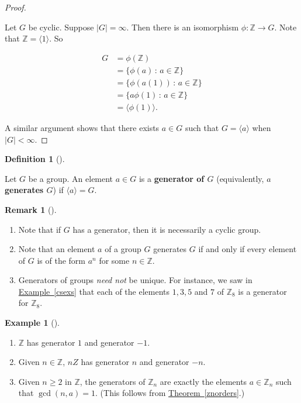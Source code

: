 \documentclass[10pt,]{book}
\newcommand{\terminology}[1]{\textbf{#1}}
\theoremstyle{plain}
\theoremstyle{definition}
\newtheorem{definition}[theorem]{Definition}
\theoremstyle{definition}
\newtheorem{remark}[theorem]{Remark}
\theoremstyle{definition}
\newtheorem{example}[theorem]{Example}
\theoremstyle{definition}
\numberwithin{equation}{section}
\def\Z{\mathbb{Z}}
\newcommand{\lt}{ < }
\newcommand{\amp}{ & }
\begin{document}
\begin{proof}\hypertarget{proof-25}{}

      Let \(G\) be cyclic. Suppose \(|G|=\infty\). Then there is an isomorphism \(\phi: \Z\to G\). Note that \(\Z=\langle 1\rangle\). So

%
\begin{align*}
 G \amp =\phi(\Z)\\
\amp =\{\phi(a)\,:\,a\in \Z\}\\
\amp =\{\phi(a(1))\,:\,a\in \Z\}\\
\amp =\{a\phi(1)\,:\,a\in \Z\}\\
\amp =\langle \phi(1)\rangle.
\end{align*}
%
\par

      A similar argument shows that there exists \(a\in G\) such that \(G=\langle a\rangle\) when \(|G|\lt \infty\).
\end{proof}
\begin{definition}[{}]\label{definition-39}

        Let \(G\) be a group. An element \(a\in G\) is a \terminology{generator of \(G\)} (equivalently, \(a\) \terminology{generates \(G\)}) if
        \(\langle a\rangle =G\).
\end{definition}
\begin{remark}[]\label{remark-23}
\leavevmode%
\begin{enumerate}
\item\hypertarget{li-257}{}
          Note that if \(G\) has a generator, then it is necessarily a cyclic group.
\item\hypertarget{li-258}{}
          Note that an element \(a\) of a group \(G\) generates \(G\) if and only if every element of \(G\) is of the form \(a^n\) for some \(n\in \Z\).
\item\hypertarget{li-259}{}
          Generators of groups \emph{need not} be unique.  For instance, we saw in \hyperref[csexs]{Example~\ref{csexs}} that each of the elements \(1,3,5\) and \(7\) of \(\Z_8\) is a generator for \(\Z_8\).
\end{enumerate}
\end{remark}
\begin{example}[]\label{example-46}
\leavevmode%
\begin{enumerate}
\item\hypertarget{li-260}{}
            \(\Z\) has generator \(1\) and generator \(-1\).
\item\hypertarget{li-261}{}
            Given \(n\in \Z\), \(nZ\) has generator \(n\) and generator \(-n\).
\item\hypertarget{li-262}{}
            Given \(n\geq 2\) in \(\Z\), the generators of \(\Z_n\) are exactly  the elements \(a\in \Z_n\) such that \(\gcd(n,a)=1\). (This follows from \hyperref[znorders]{Theorem~\ref{znorders}}.)
\end{enumerate}
\end{example}
\end{document}
